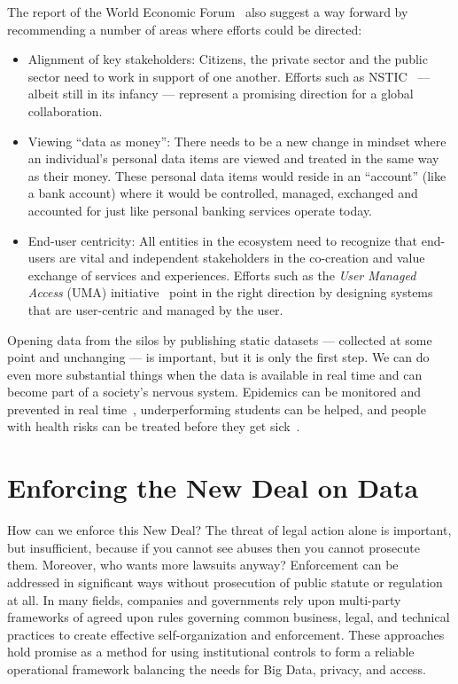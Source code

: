 The report of the World Economic Forum~\cite{WEF2011} also suggest a way forward by recommending
a number of areas where efforts could be directed:
\begin{itemize}
\item Alignment of key stakeholders:  
Citizens, the private sector and the public sector
need to work in support of one another.
Efforts such as NSTIC~\cite{NSTIC2011} --- albeit still in its infancy ---
represent a promising direction
for a global collaboration.


\item Viewing ``data as money'':
There needs to be a new change in mindset where
an individual's personal data items are viewed
and treated in the same way as their money.
These personal data items would reside in an ``account'' (like a bank account)
 where it would be controlled, managed, exchanged and 
accounted for just like personal banking services operate today.


\item End-user centricity:  All entities in the ecosystem need to
recognize that end-users are vital and 
independent stakeholders in the co-creation 
and value exchange of services and experiences.
Efforts such as the {\em User Managed Access} (UMA) initiative~\cite{UMAcore}
point in the right direction by designing systems that are
user-centric and managed by the user.


\end{itemize}

Opening data from the silos by publishing static datasets --- collected at some point and unchanging --- is important, but it is only the first step.
We can do even more substantial things when the data is available in real time and can become part of a society's nervous system.
Epidemics can be monitored and prevented in real time~\cite{pentland2009using}, underperforming students can be helped, and people with health risks can be treated before they get sick~\cite{tacconi2008activity}.

\section{Enforcing the New Deal on Data }

How can we enforce this New Deal?
The threat of legal action alone is important, but insufficient, because if you cannot see abuses then you cannot prosecute them.
Moreover, who wants more lawsuits anyway?
Enforcement can be addressed in significant ways without prosecution of public statute or regulation at all.
In many fields, companies and governments rely upon multi-party frameworks of agreed upon rules governing common business, legal, and technical practices to create effective self-organization and enforcement.
These approaches hold promise as a method for using institutional controls to form a reliable operational framework balancing the needs for Big Data, privacy, and access.


